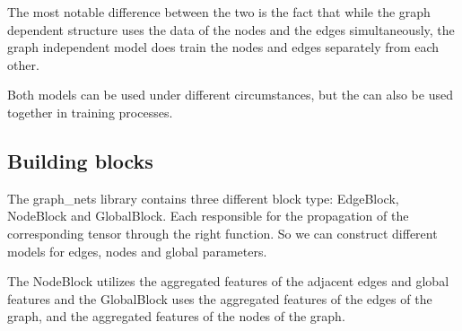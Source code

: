 The most notable difference between the two is the fact that while the graph dependent structure uses the data of the nodes and the edges simultaneously, the graph independent model does train the nodes and edges separately from each other.

Both models can be used under different circumstances, but the can also be used together in training processes.

\subsection{Building blocks}
The graph\_nets library contains three different block type: EdgeBlock, NodeBlock and GlobalBlock. Each responsible for the propagation of the corresponding tensor through the right function. So we can construct different models for edges, nodes and global parameters.

The NodeBlock utilizes the aggregated features of the adjacent edges and global features and the GlobalBlock uses the aggregated features of the edges of the graph, and the aggregated features of the nodes of the graph.